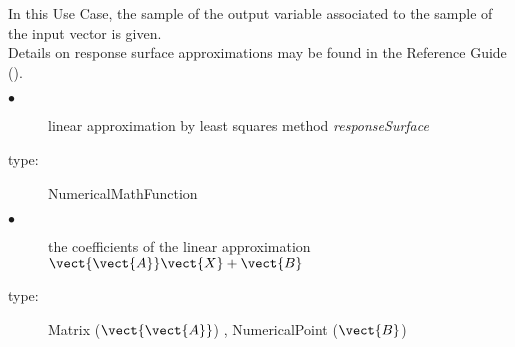 \renewcommand{\filename}{docUC_RespSurface_LeastSquaresApprox2.tex}
\renewcommand{\filetitle}{UC : Linear Least Squares approximation from a sample of the input vector and a sample of the output vector}

\HeaderIIILevel

\label{leastSquareApprox2}




In this Use Case,  the  sample of the output variable associated to the sample of the input vector is given.\\



Details on response surface approximations may be found in the Reference Guide ().\\




             {
               \begin{description}
               \item[$\bullet$] linear approximation by least squares method {\itshape responseSurface}
               \item[type:] NumericalMathFunction
               \item[$\bullet$]  the coefficients of the linear approximation $\vect{\vect{A}}\vect{X} + \vect{B}$
               \item[type:] Matrix ($\vect{\vect{A}}$) , NumericalPoint ($\vect{B}$)
               \end{description}
             }

